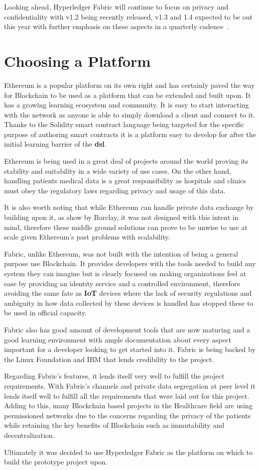 Looking ahead, Hyperledger Fabric will continue to focus on privacy and
confidentiality with v1.2 being recently released, v1.3 and 1.4 expected to be
out this year with further emphasis on these aspects in a quarterly
cadence~\cite{hyperledgerRoadmap2018}.

\section{Choosing a Platform}\label{choosePlatform}

Ethereum is a popular platform on its own right and has certainly paved the way
for Blockchain to be used as a platform that can be extended and built upon. It
has a growing learning ecosystem and community. It is easy to start interacting
with the network as anyone is able to simply download a client and connect to
it.  Thanks to the Solidity smart contract language being targeted for the
specific purpose of authoring smart contracts it is a platform easy to develop
for after the initial learning barrier of the \textbf{dsl}. 

Ethereum is being used in a great deal of projects around the world proving its
stability and suitability in a wide variety of use cases. On the other hand,
handling patients medical data is a great responsibility as hospitals and
clinics must obey the regulatory laws regarding privacy and usage of this data.

It is also worth noting that while Ethereum can handle private data exchange by
building upon it, as show by Barclay, it was not designed with this intent in
mind, therefore these middle ground solutions can prove to be unwise to use at
scale given Ethereum's past problems with scalability.

Fabric, unlike Ethereum, was not built with the intention of being a general
purpose use Blockchain. It provides developers with the tools needed to build
any system they can imagine but is clearly focused on making organizations feel
at ease by providing an identity service and a controlled environment,
therefore avoiding the same fate as \textbf{IoT} devices where the lack of
security regulations and ambiguity in how data collected by these devices is
handled has stopped these to be used in official capacity.

Fabric also has good amount of development tools that are now maturing and a
good learning environment with ample documentation about every aspect important
for a developer looking to get started into it. Fabric is being backed by the
Linux Foundation and IBM that lends credibility to the project.

Regarding Fabric's features, it lends itself very well to fulfill the project
requirements. With Fabric's channels and private data segregation at peer level
it lends itself well to fulfill all the requirements that were laid out for
this project. Adding to this, many Blockchain based projects in the Healthcare
field are using permissioned networks due to the concerns regarding the privacy
of the patients while retaining the key benefits of Blockchain such as
immutability and decentralization.

Ultimately it was decided to use Hyperledger Fabric as the platform on which to
build the prototype project upon.
